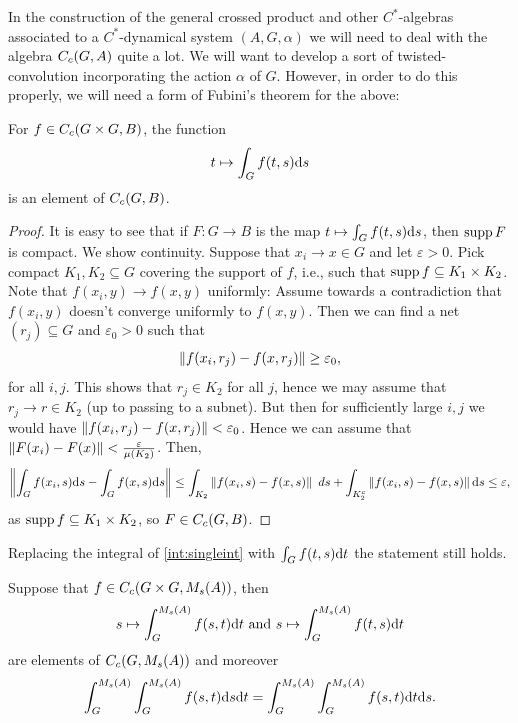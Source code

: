 In the construction of the general crossed product and other $C^*$-algebras associated to a $C^*$-dynamical system $(A,G,\alpha)$ we will need to deal with the algebra $C_c(G,A)$ quite a lot. We will want to develop a sort of twisted-convolution incorporating the action $\alpha$ of $G$. However, in order to do this properly, we will need a form of Fubini's theorem for the above:
\begin{lemma}
For $f \in C_c(G \times G  , B)$, the function
\begin{align*}
	t \mapsto \int_G f(t,s) \mathrm{d} s
\end{align*}
is an element of $C_c(G,B)$.
\label{int:singleint}
\end{lemma}
\begin{proof}
It is easy to see that if $F \colon G \to B$ is the map $t \mapsto \int_G f(t,s) \mathrm{d} s$, then $ \operatorname{supp} F$ is compact. We show continuity. Suppose that $x_i \to x \in G$ and let $ \varepsilon > 0$. Pick compact $K_1,K_2 \subseteq G$ covering the support of $f$, i.e., such that $ \operatorname{supp} f \subseteq K_1 \times K_2$. Note that $f(x_i,y) \to f(x,y)$ uniformly: Assume towards a contradiction that $f(x_i,y)$ doesn't converge uniformly to $f(x,y)$. Then we can find a net $(r_j)\subseteq G$ and $\varepsilon_0 > 0$ such that
\begin{align*}
	\left\lVert f(x_i,r_j) - f(x,r_j) \right\rVert \geq \varepsilon_0,
\end{align*}
for all $i,j$. This shows that $r_j \in K_2$ for all $j$, hence we may assume that $r_j \to r \in K_2$ (up to passing to a subnet). But then for sufficiently large $i,j$ we would have $\left\lVert f(x_i,r_j) - f(x,r_j) \right\rVert < \varepsilon_0$. Hence we can assume that $\left\lVert F(x_i) - F(x) \right\rVert < \frac{\varepsilon}{ \mu(K_2)}$. Then, 
\begin{align*}
	\left\lVert \int_G f(x_i,s) \mathrm{d} s - \int_G f(x,s) \mathrm{d} s \right\rVert \leq \int_{K_2} \left\lVert f(x_i,s) - f(x,s) \right\rVert \ d s + \int_{K_2^c} \left\lVert f(x_i,s) - f(x,s) \right\rVert \mathrm{d} s  \leq \varepsilon,
\end{align*}
as $\operatorname{supp} f \subseteq K_1 \times K_2$, so $F \in C_c(G,B)$.
\end{proof}
\begin{corollary}
Replacing the integral of \cref{int:singleint} with $\int_G f(t,s) \mathrm{d} t$ the statement still holds.
\end{corollary}
\begin{theorem}
Suppose that $f \in C_c(G \times G, M_s(A))$, then 
\begin{align*}
	s \mapsto \int_G^{M_s(A)} f(s,t) \mathrm{d} t \text{ and } s \mapsto \int_G^{M_s(A)} f(t,s) \mathrm{d} t
\end{align*}
are elements of $C_c(G,M_s(A))$ and moreover
\begin{align*}
	\int_G^{M_s(A)} \int_G^{M_s(A)} f(s,t) \mathrm{d} s \mathrm{d} t = \int_G^{M_s(A)} \int_G^{M_s(A)} f(s,t) \mathrm{d} t \mathrm{d} s.
\end{align*}
\label{int:fubini}
\end{theorem}
